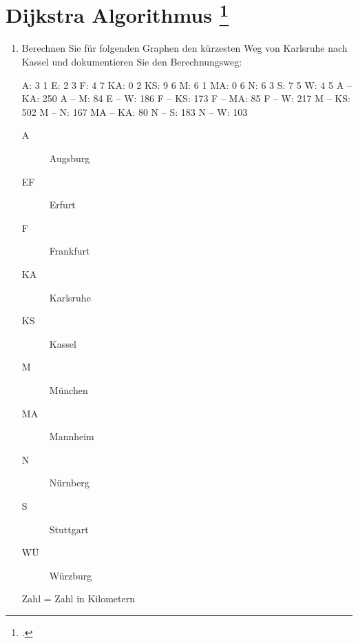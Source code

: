 \documentclass{bschlangaul-aufgabe}
\begin{document}

\section{Dijkstra Algorithmus
\footcite[Thema 2 Aufgabe 6 Seite 9]{examen:66115:2016:03}}

\begin{enumerate}


\item Berechnen Sie für folgenden Graphen den kürzesten Weg von
Karlsruhe nach Kassel und dokumentieren Sie den Berechnungsweg:

\begin{liGraphenFormat}
A: 3 1
E: 2 3
F: 4 7
KA: 0 2
KS: 9 6
M: 6 1
MA: 0 6
N: 6 3
S: 7 5
W: 4 5
A -- KA: 250
A -- M: 84
E -- W: 186
F -- KS: 173
F -- MA: 85
F -- W: 217
M -- KS: 502
M -- N: 167
MA -- KA: 80
N -- S: 183
N -- W: 103
\end{liGraphenFormat}


\begin{description}
\item[A] Augsburg
\item[EF] Erfurt
\item[F] Frankfurt
\item[KA] Karlsruhe
\item[KS] Kassel
\item[M] München
\item[MA] Mannheim
\item[N] Nürnberg
\item[S] Stuttgart
\item[WÜ] Würzburg
\end{description}

Zahl = Zahl in Kilometern

\begin{center}
\end{center}


\end{enumerate}
\end{document}
